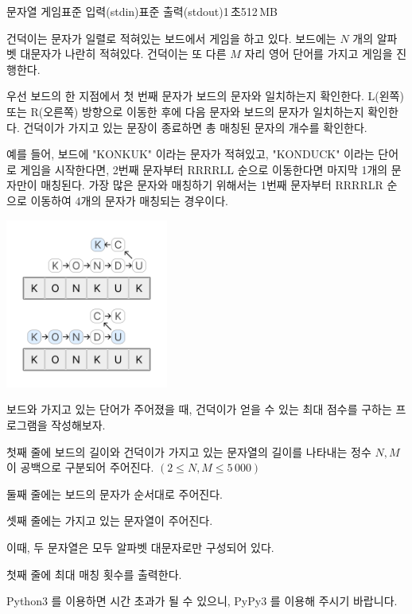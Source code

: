 \begin{problem}{문자열 게임}{표준 입력(stdin)}{표준 출력(stdout)}{1\,초}{512\,MB}

건덕이는 문자가 일렬로 적혀있는 보드에서 게임을 하고 있다. 보드에는 $N$ 개의 알파벳 대문자가 나란히 적혀있다. 건덕이는 또 다른 $M$ 자리 영어 단어를 가지고 게임을 진행한다.

우선 보드의 한 지점에서 첫 번째 문자가 보드의 문자와 일치하는지 확인한다.
L(왼쪽) 또는 R(오른쪽) 방향으로 이동한 후에 다음 문자와 보드의 문자가 일치하는지 확인한다.
건덕이가 가지고 있는 문장이 종료하면 총 매칭된 문자의 개수를 확인한다.

예를 들어, 보드에 "KONKUK" 이라는 문자가 적혀있고, "KONDUCK" 이라는 단어로 게임을 시작한다면, 2번째 문자부터 RRRRLL 순으로 이동한다면 마지막 1개의 문자만이 매칭된다. 가장 많은 문자와 매칭하기 위해서는 1번째 문자부터 RRRRLR 순으로 이동하여 4개의 문자가 매칭되는 경우이다.

\begin{center}
  \includegraphics[width=0.4\textwidth]{../pictures/image.png} \\
\end{center}

보드와 가지고 있는 단어가 주어졌을 때, 건덕이가 얻을 수 있는 최대 점수를 구하는 프로그램을 작성해보자.

\InputFile
첫째 줄에 보드의 길이와 건덕이가 가지고 있는 문자열의 길이를 나타내는 정수 $N, M$이 공백으로 구분되어 주어진다. $( 2 \le N, M \le 5\,000 )$

둘째 줄에는 보드의 문자가 순서대로 주어진다.

셋째 줄에는 가지고 있는 문자열이 주어진다.

이때, 두 문자열은 모두 알파벳 대문자로만 구성되어 있다.

\OutputFile
첫째 줄에 최대 매칭 횟수를 출력한다.

\Examples

\begin{example}
%
%
%
\end{example}

\Note
Python3 를 이용하면 시간 초과가 될 수 있으니, PyPy3 를 이용해 주시기 바랍니다.
\end{problem}
